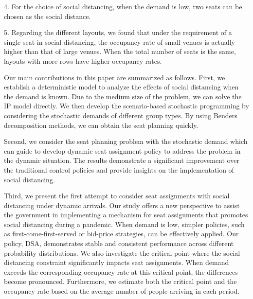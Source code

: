 4. For the choice of social distancing, when the demand is low, two seats can be chosen as the social distance.

5.  Regarding the different layouts, we found that under the requirement of a single seat in social distancing, the occupancy rate of small venues is actually higher than that of large venues. When the total number of seats is the same, layouts with more rows have higher occupancy rates.


Our main contributions in this paper are summarized as follows. First, we establish a deterministic model to analyze the effects of social distancing when the demand is known. Due to the medium size of the problem, we can solve the IP model directly. We then develop the scenario-based stochastic programming by considering the stochastic demands of different group types. By using Benders decomposition methods, we can obtain the seat planning quickly. 

Second, we consider the seat planning problem with the stochastic demand which can guide to develop dynamic seat assignment policy to address the problem in the dynamic situation. The results demonstrate a significant improvement over the traditional control policies and provide insights on the implementation of social distancing.

Third, we present the first attempt to consider seat assignments with social distancing under dynamic arrivals. Our study offers a new perspective to assist the government in implementing a mechanism for seat assignments that promotes social distancing during a pandemic. When demand is low, simpler policies, such as first-come-first-served or bid-price strategies, can be effectively applied.
Our policy, DSA, demonstrates stable and consistent performance across different probability distributions. We also investigate the critical point where the social distancing constraint significantly impacts seat assignments. When demand exceeds the corresponding occupancy rate at this critical point, the differences become pronounced. Furthermore, we estimate both the critical point and the occupancy rate based on the average number of people arriving in each period.

